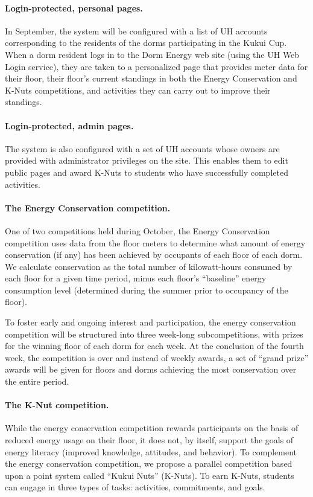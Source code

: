 \documentclass[11pt]{article}
\begin{document}
\paragraph{Login-protected, personal pages.}  In September, the system will
be configured with a list of UH accounts corresponding to the residents of
the dorms participating in the Kukui Cup.  When a dorm resident logs in to
the Dorm Energy web site (using the UH Web Login service), they are taken
to a personalized page that provides meter data for their floor, their
floor's current standings in both the Energy Conservation and K-Nuts
competitions, and activities they can carry out to improve their standings.

\paragraph{Login-protected, admin pages.}  The system is also configured
with a set of UH accounts whose owners are provided with administrator
privileges on the site.  This enables them to edit public pages and award
K-Nuts to students who have successfully completed activities.

\paragraph{The Energy Conservation competition.}  One of two competitions
held during October, the Energy Conservation competition uses data from the
floor meters to determine what amount of energy conservation (if any) has
been achieved by occupants of each floor of each dorm.  We calculate
conservation as the total number of kilowatt-hours consumed by each floor
for a given time period, minus each floor's ``baseline'' energy consumption
level (determined during the summer prior to occupancy of the floor).

To foster early and ongoing interest and participation, the energy
conservation competition will be structured into three week-long
subcompetitions, with prizes for the winning floor of each dorm for each
week.  At the conclusion of the fourth week, the competition is over and
instead of weekly awards, a set of ``grand prize'' awards will be given for
floors and dorms achieving the most conservation over the entire period.

\paragraph{The K-Nut competition.}  While the energy conservation
competition rewards participants on the basis of reduced energy usage on
their floor, it does not, by itself, support the goals of energy literacy
(improved knowledge, attitudes, and behavior).  To complement the energy
conservation competition, we propose a parallel competition based upon a
point system called ``Kukui Nuts'' (K-Nuts).   To earn K-Nuts, students can 
engage in three types of tasks: activities, commitments, and goals.
\end{document}
